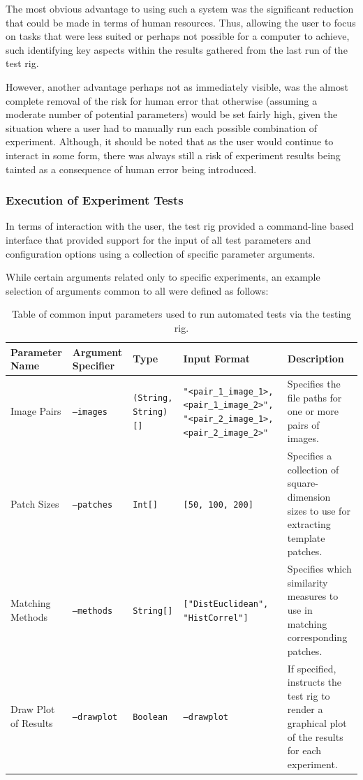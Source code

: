 The most obvious advantage to using such a system was the significant reduction that could be made in terms of human resources. Thus, allowing the user to focus on tasks that were less suited or perhaps not possible for a computer to achieve, such identifying key aspects within the results gathered from the last run of the test rig. 

However, another advantage perhaps not as immediately visible, was the almost complete removal of the risk for human error that otherwise (assuming a moderate number of potential parameters) would be set fairly high, given the situation where a user had to manually run each possible combination of experiment. Although, it should be noted that as the user would continue to interact in some form, there was always still a risk of experiment results being tainted as a consequence of human error being introduced. 


\subsubsection{Execution of Experiment Tests}

In terms of interaction with the user, the test rig provided a command-line based interface that provided support for the input of all test parameters and configuration options using a collection of specific parameter arguments. 

While certain arguments related only to specific experiments, an example selection of arguments common to all were defined as follows:

\begin{table}[h]
\small
\begin{tabular}{|p{2cm}|p{2cm}|p{2cm}|p{3.5cm}|p{3.5cm}|}
\hline
Parameter Name & Argument Specifier & Type  & Input Format & Description \\ \hline
Image Pairs & \texttt{--images} & \texttt{(String, String)[]} & \texttt{"\textless pair\_1\_image\_1\textgreater, \textless pair\_1\_image\_2\textgreater", "\textless pair\_2\_image\_1\textgreater, \textless pair\_2\_image\_2\textgreater"} & Specifies the file paths for one or more pairs of images. \\ \hline
Patch Sizes & \texttt{--patches} & \texttt{Int[]} & \texttt{[50, 100, 200]} & Specifies a collection of square-dimension sizes to use for extracting template patches. \\ \hline  
Matching Methods & \texttt{--methods} & \texttt{String[]} & \texttt{["DistEuclidean", "HistCorrel"]} & Specifies which similarity measures to use in matching corresponding patches. \\ \hline   
Draw Plot of Results & \texttt{--drawplot} & \texttt{Boolean} & \texttt{--drawplot} & If specified, instructs the test rig to render a graphical plot of the results for each experiment. \\ \hline  
\end{tabular}
\caption {Table of common input parameters used to run automated tests via the testing rig.}
\end{table}

